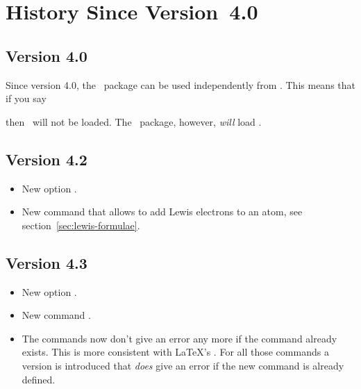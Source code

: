 \documentclass[load-preamble+]{cnltx-doc}
\begin{document}

\appendix
\section{History Since Version~4.0}
\subsection{Version 4.0}
Since version 4.0, the \chemformula\ package can be used
independently from \chemmacros.  This means that if you say
\begin{sourcecode}
  \usepackage{chemformula}
\end{sourcecode}
then \chemmacros\ will not be loaded.  The \chemmacros\ package, however,
\emph{will} load \chemformula.

\subsection{Version 4.2}
\begin{itemize}
  \item New option .
  \item New command  that allows to add Lewis electrons to an
    atom, see section~\ref{sec:lewis-formulae}.
\end{itemize}

\subsection{Version 4.3}
\begin{itemize}
  \item New option .
  \item New command .
  \item The commands  now don't give an error any
    more if the command already exists.  This is more consistent with \LaTeX's
    .  For all those commands a version
     is introduced that \emph{does} give an error if
    the new command is already defined.
\end{itemize}
\end{document}
